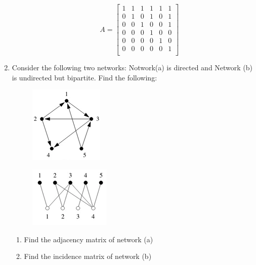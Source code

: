 \documentclass{amsart}
\theoremstyle{definition}
\theoremstyle{remark}
\numberwithin{equation}{section}
\begin{document}
\begin{enumerate}
\begin{enumerate}
    \begin{equation*}
        {A}  = \left\lbrack\begin{array}{cccccc}
        1 & 1 & 1 & 1 & 1 & 1 \\
        0 & 1 & 0 & 1 & 0 & 1 \\
        0 & 0 & 1 & 0 & 0 & 1 \\
        0 & 0 & 0 & 1 & 0 & 0 \\
        0 & 0 & 0 & 0 & 1 & 0 \\
        0 & 0 & 0 & 0 & 0 & 1 \\
        \end{array}\right\rbrack
    \end{equation*}
\end{enumerate}

\clearpage

\item Consider the following two networks: Notwork(a) is directed and Network (b) is undirected but bipartite. Find the following:
\begin{figure}[h]
\includegraphics[width=0.2\linewidth]{images/networka.PNG}
\end{figure}

\begin{figure}[h]
\includegraphics[width=0.2\linewidth]{images/networkb.PNG}
\end{figure}
\begin{enumerate}
\item Find the adjacency matrix of network (a)
\item Find the incidence matrix of network (b)
\end{enumerate}

\vspace{5cm}


\end{enumerate}
\end{document}
